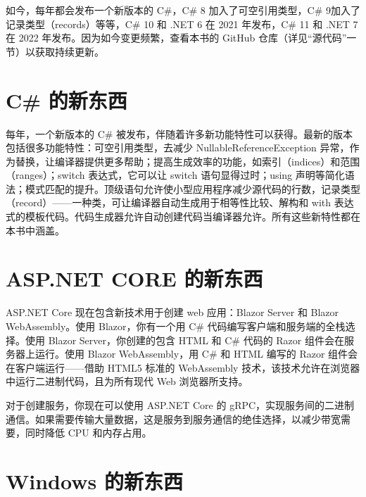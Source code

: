 如今，每年都会发布一个新版本的 C\#，C\# 8 加入了可空引用类型，C\# 9加入了记录类型（records）等等，C\# 10 和 .NET 6 在 2021 年发布，C\# 11 和 .NET 7 在 2022 年发布。因为如今变更频繁，查看本书的 GitHub 仓库（详见“源代码”一节）以获取持续更新。

\section*{C\# 的新东西}
每年，一个新版本的 C\# 被发布，伴随着许多新功能特性可以获得。最新的版本包括很多功能特性：可空引用类型，去减少 NullableReferenceException 异常，作为替换，让编译器提供更多帮助；提高生成效率的功能，如索引（indices）和范围（ranges）；switch 表达式，它可以让 switch 语句显得过时；using 声明等简化语法；模式匹配的提升。顶级语句允许使小型应用程序减少源代码的行数，记录类型（record）——一种类，可让编译器自动生成用于相等性比较、解构和 with 表达式的模板代码。代码生成器允许自动创建代码当编译器允许。所有这些新特性都在本书中涵盖。

\section*{ASP.NET CORE 的新东西}
ASP.NET Core 现在包含新技术用于创建 web 应用：Blazor Server 和 Blazor WebAssembly。使用 Blazor，你有一个用 C\# 代码编写客户端和服务端的全栈选择。使用 Blazor Server，你创建的包含 HTML 和 C\# 代码的 Razor 组件会在服务器上运行。使用 Blazor WebAssembly，用 C\# 和 HTML 编写的 Razor 组件会在客户端运行——借助 HTML5 标准的 WebAssembly 技术，该技术允许在浏览器中运行二进制代码，且为所有现代 Web 浏览器所支持。

对于创建服务，你现在可以使用 ASP.NET Core 的 gRPC，实现服务间的二进制通信。如果需要传输大量数据，这是服务到服务通信的绝佳选择，以减少带宽需要，同时降低 CPU 和内存占用。

\section{Windows 的新东西}